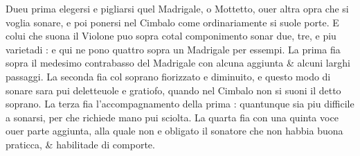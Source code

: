 Dueu prima elegersi e pigliarsi quel Madrigale, o Mottetto, ouer altra opra che si voglia sonare, e poi ponersi nel Cimbalo come ordinariamente si suole porte. E colui che suona il Violone puo sopra cotal componimento sonar due, tre, e piu varietadi : e qui ne pono quattro sopra un Madrigale per essempi. La prima fia sopra il medesimo contrabasso del Madrigale con alcuna aggiunta \& alcuni larghi passaggi. La seconda fia col soprano fiorizzato e diminuito, e questo modo di sonare sara pui deletteuole e gratiofo, quando nel Cimbalo non si suoni il detto soprano. La terza fia l'accompagnamento della prima : quantunque sia piu difficile a sonarsi, per che richiede mano pui sciolta. La quarta fia con una quinta voce ouer parte aggiunta, alla quale non e obligato il sonatore che non habbia buona praticca, & habilitade di comporte.
